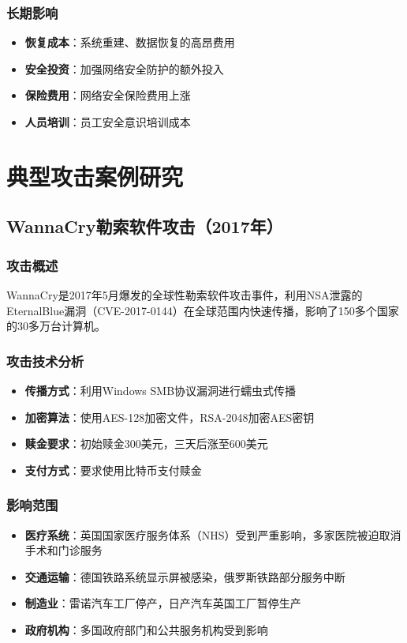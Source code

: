 \documentclass[12pt,a4paper]{article}
\begin{document}
\subsubsection{长期影响}
\begin{itemize}
    \item \textbf{恢复成本}：系统重建、数据恢复的高昂费用
    \item \textbf{安全投资}：加强网络安全防护的额外投入
    \item \textbf{保险费用}：网络安全保险费用上涨
    \item \textbf{人员培训}：员工安全意识培训成本
\end{itemize}

\section{典型攻击案例研究}

\subsection{WannaCry勒索软件攻击（2017年）}

\subsubsection{攻击概述}
WannaCry是2017年5月爆发的全球性勒索软件攻击事件，利用NSA泄露的EternalBlue漏洞（CVE-2017-0144）在全球范围内快速传播，影响了150多个国家的30多万台计算机。

\subsubsection{攻击技术分析}
\begin{itemize}
    \item \textbf{传播方式}：利用Windows SMB协议漏洞进行蠕虫式传播
    \item \textbf{加密算法}：使用AES-128加密文件，RSA-2048加密AES密钥
    \item \textbf{赎金要求}：初始赎金300美元，三天后涨至600美元
    \item \textbf{支付方式}：要求使用比特币支付赎金
\end{itemize}

\subsubsection{影响范围}
\begin{itemize}
    \item \textbf{医疗系统}：英国国家医疗服务体系（NHS）受到严重影响，多家医院被迫取消手术和门诊服务
    \item \textbf{交通运输}：德国铁路系统显示屏被感染，俄罗斯铁路部分服务中断
    \item \textbf{制造业}：雷诺汽车工厂停产，日产汽车英国工厂暂停生产
    \item \textbf{政府机构}：多国政府部门和公共服务机构受到影响
\end{itemize}
\end{document}
